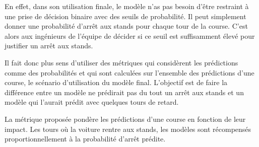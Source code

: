 En effet, dans son utilisation finale, le modèle n'as pas besoin d'être restraint à une prise de décision binaire avec des seuils de probabilité.
Il peut simplement donner une probabilité d'arrêt aux stands pour chaque tour de la course. C'est alors aux ingénieurs de l'équipe de décider
si ce seuil est suffisamment élevé pour justifier un arrêt aux stands.

Il fait donc plus sens d'utiliser des métriques qui considèrent les prédictions comme des probabilités et qui sont calculées sur l'ensemble des prédictions d'une course,
le scénario d'utilisation du modèle final. L'objectif est de faire la différence entre un modèle ne prédirait pas du tout un arrêt aux stands et un modèle qui l'aurait prédit
avec quelques tours de retard.

La métrique proposée pondère les prédictions d'une course en fonction de leur impact. Les tours où la voiture rentre aux stands, les modèles sont récompensés
proportionnellement à la probabilité d'arrêt prédite.